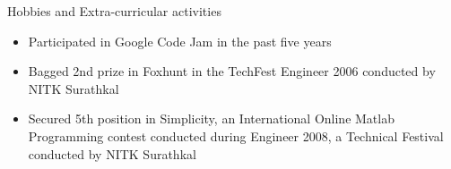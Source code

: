 \documentclass[10pt]{article}
\begin{document}
\begin{cv}
%
%
%
%
%
%
%
%
%
%
%
%


\begin{cvlist}{Hobbies and Extra-curricular activities}
\item
\begin{itemize}\itemsep=0.25em
\item Participated in Google Code Jam in the past five years
	\item
Bagged 2nd prize in Foxhunt in the TechFest Engineer 2006
conducted by NITK Surathkal
\item
Secured 5th position in Simplicity, an International
Online Matlab Programming contest conducted during
Engineer 2008, a Technical Festival conducted by NITK
Surathkal


\end{itemize}
\end{cvlist}
\end{cv}
\end{document}
